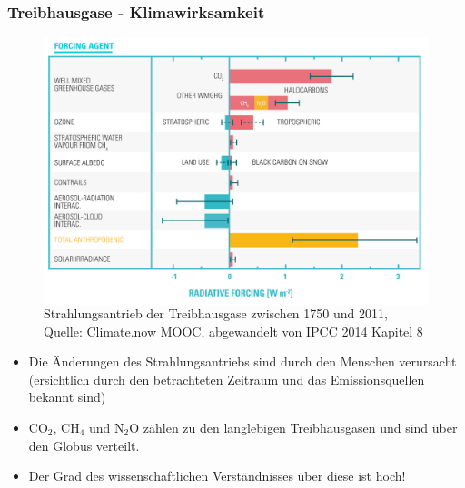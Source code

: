 \begin{frame}
	\frametitle{Treibhausgase - Klimawirksamkeit}
		\begin{figure}
			\begin{columns}
				\includegraphics[width=0.9\linewidth]{bilder/radiative_forcing_CCnow_mooc.jpg}
				\caption{Strahlungsantrieb der Treibhausgase zwischen 1750 und 2011, Quelle: Climate.now MOOC, abgewandelt von IPCC 2014 Kapitel 8}
			\end{columns}
		\end{figure}
\begin{itemize}
	\item Die Änderungen des Strahlungsantriebs sind durch den Menschen verursacht (ersichtlich durch den betrachteten Zeitraum und das Emissionsquellen bekannt sind)
	\item CO$_2$, CH$_4$ und N$_2$O zählen zu den langlebigen Treibhausgasen und sind über den Globus verteilt.
	\item Der Grad des wissenschaftlichen Verständnisses über diese ist hoch!
\end{itemize}
\end{frame}
